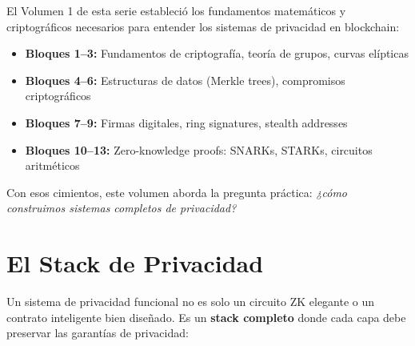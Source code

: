 \documentclass[11pt,a4paper,twoside]{book}
\theoremstyle{definition}
\theoremstyle{remark}
\begin{document}
El Volumen 1 de esta serie estableció los fundamentos matemáticos y criptográficos necesarios para entender los sistemas de privacidad en blockchain:

\begin{itemize}
    \item \textbf{Bloques 1--3:} Fundamentos de criptografía, teoría de grupos, curvas elípticas
    \item \textbf{Bloques 4--6:} Estructuras de datos (Merkle trees), compromisos criptográficos
    \item \textbf{Bloques 7--9:} Firmas digitales, ring signatures, stealth addresses
    \item \textbf{Bloques 10--13:} Zero-knowledge proofs: SNARKs, STARKs, circuitos aritméticos
\end{itemize}

Con esos cimientos, este volumen aborda la pregunta práctica: \textit{¿cómo construimos sistemas completos de privacidad?}

\section*{El Stack de Privacidad}

Un sistema de privacidad funcional no es solo un circuito ZK elegante o un contrato inteligente bien diseñado. Es un \textbf{stack completo} donde cada capa debe preservar las garantías de privacidad:
\end{document}
